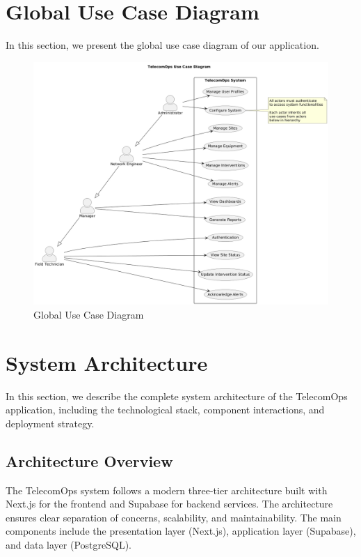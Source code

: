 \section{Global Use Case Diagram}
In this section, we present the global use case diagram of our application.
\begin{figure}[hbt!]
    \centering
    \includegraphics[width=0.95\linewidth]{img/chap_02/TelecomOps_UseCase_Diagram.png}
    \caption{Global Use Case Diagram}
    \label{fig:use_case_global}
\end{figure}
\vspace{1cm}

\section{System Architecture}
In this section, we describe the complete system architecture of the TelecomOps application, including the technological stack, component interactions, and deployment strategy.

\subsection{Architecture Overview}
The TelecomOps system follows a modern three-tier architecture built with Next.js for the frontend and Supabase for backend services. The architecture ensures clear separation of concerns, scalability, and maintainability. The main components include the presentation layer (Next.js), application layer (Supabase), and data layer (PostgreSQL).

